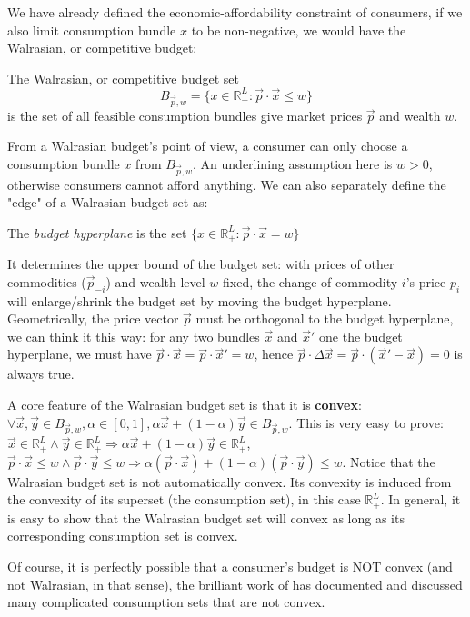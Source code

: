 We have already defined the economic-affordability constraint of consumers, if we also limit consumption bundle $x$ to be non-negative, we would have the Walrasian, or competitive budget:

\begin{definition}
    The Walrasian, or competitive budget set $$B_{\vec{p},w}=\{x\in\mathbb{R}^L_+:\vec{p}\cdot\vec{x}\leq w\}$$ is the set of all feasible consumption bundles give market prices $\vec{p}$ and wealth $w$.
\end{definition}

From a Walrasian budget's point of view, a consumer can only choose a consumption bundle $x$ from $B_{\vec{p},w}$. An underlining assumption here is $w>0$, otherwise consumers cannot afford anything. We can also
separately define the "edge" of a Walrasian budget set as:
\begin{definition}
    The \textit{budget hyperplane} is the set $\{x\in\mathbb{R}^L_+:\vec{p}\cdot\vec{x}=w\}$
\end{definition}
It determines the upper bound of the budget set: with prices of other commodities ($\vec{p}_{-i}$) and wealth level $w$ fixed, the change of commodity $i$'s price $p_i$ will enlarge/shrink the budget set by moving the budget hyperplane.
Geometrically, the price vector $\vec{p}$ must be orthogonal to the budget hyperplane, we can think it this way: for any two bundles $\vec{x}$ and $\vec{x}'$ one the budget hyperplane, we must have $\vec{p}\cdot\vec{x}=\vec{p}\cdot\vec{x}'=w$, hence
$\vec{p}\cdot\Delta\vec{x}=\vec{p}\cdot(\vec{x}'-\vec{x})=0$ is always true.

A core feature of the Walrasian budget set is that it is \textbf{convex}: $\forall \vec{x},\vec{y}\in B_{\vec{p},w}, \alpha\in[0,1], \alpha\vec{x}+(1-\alpha)\vec{y}\in B_{\vec{p},w}$. This is very easy to prove: $\vec{x}\in\mathbb{R}^L_+\land\vec{y}\in\mathbb{R}^L_+\Rightarrow \alpha\vec{x}+(1-\alpha)\vec{y}\in \mathbb{R}^L_+$, $\vec{p}\cdot\vec{x}\leq w\land\vec{p}\cdot \vec{y}\leq w\Rightarrow \alpha(\vec{p}\cdot\vec{x})+(1-\alpha)(\vec{p}\cdot\vec{y})\leq w$.
Notice that the Walrasian budget set is not automatically convex. Its convexity is induced from the convexity of its superset (the consumption set), in this case $\mathbb{R}^L_+$. In general, it is easy to show that the Walrasian budget set will convex as long as its corresponding consumption set is convex.

Of course, it is perfectly possible that a consumer's budget is NOT convex (and not Walrasian, in that sense), the brilliant work of \citet[]{deaton1980economics} has documented and discussed many complicated consumption sets that are not convex.

